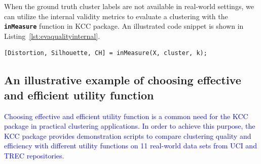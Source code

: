 \documentclass[10pt]{acmtrans2e}
\newcommand{\package}[1]{\textsf{#1}\xspace} %
\newcommand{\function}[1]{\textbf{\texttt{#1}}}
\begin{document}
When the ground truth cluster labels are not available in real-world settings, we can utilize the internal validity metrics to evaluate a clustering with the \function{inMeasure} function in \package{KCC} package. An illustrated code snippet is shown in Listing~\ref{lst:evaqualityinternal}.
\begin{lstlisting}[caption={Using \function{inMeasure} to evaluate the clustering quality.},label=lst:evaqualityinternal]
[Distortion, Silhouette, CH] = inMeasure(X, cluster, k);
\end{lstlisting}

\subsection{An illustrative example of choosing effective and efficient utility function}\label{subsec:example1}
\textcolor{blue}{Choosing effective and efficient utility function is a common need for the \package{KCC} package in practical clustering applications. In order to achieve this purpose, the \package{KCC} package provides demonstration scripts to compare clustering quality and efficiency with different utility functions on 11 real-world data sets from UCI and TREC repositories.}
\end{document}
